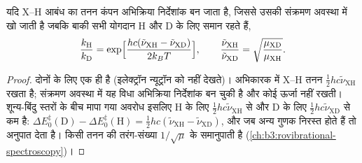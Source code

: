 \begin{proposition}\label{prop:b3:rate-theories:primary-kie}
यदि X--H आबंध का तनन कंपन अभिक्रिया निर्देशांक बन जाता है,
जिससे उसकी  संक्रमण अवस्था में खो जाती है जबकि बाकी सभी
योगदान H और D के लिए समान रहते हैं,
\[
  \frac{k_{\mathrm H}}{k_{\mathrm D}} = \exp\Bigl[\frac{hc(\tilde\nu_{\mathrm{XH}} - \tilde\nu_{\mathrm{XD}})}{2k_BT}\Bigr],
  \qquad \frac{\tilde\nu_{\mathrm{XH}}}{\tilde\nu_{\mathrm{XD}}} = \sqrt{\frac{\mu_{\mathrm{XD}}}{\mu_{\mathrm{XH}}}} .
\]
\end{proposition}

\begin{proof}
 दोनों  के लिए एक ही है (इलेक्ट्रॉन
न्यूट्रॉन को नहीं देखते)। अभिकारक में X--H तनन
$\frac12hc\tilde\nu_{\mathrm{XH}}$  रखता है; संक्रमण अवस्था में यह विधा
अभिक्रिया निर्देशांक बन चुकी है और कोई ऊर्जा नहीं रखती। शून्य-बिंदु
स्तरों के बीच मापा गया अवरोध इसलिए H के लिए $\frac12hc\tilde\nu_{\mathrm{XH}}$ से और D के लिए $\frac12hc\tilde\nu_{\mathrm{XD}}$ से कम है: $\Delta E_0^{\ddagger}(\mathrm D) -
\Delta E_0^{\ddagger}(\mathrm H) = \frac12hc(\tilde\nu_{\mathrm{XH}} - \tilde\nu_{\mathrm{XD}})$, और जब
अन्य गुणक निरस्त होते हैं तो  अनुपात देता है। किसी तनन की तरंग-संख्या
$1/\sqrt\mu$ के समानुपाती है (\cref{ch:b3:rovibrational-spectroscopy})।
\end{proof}

